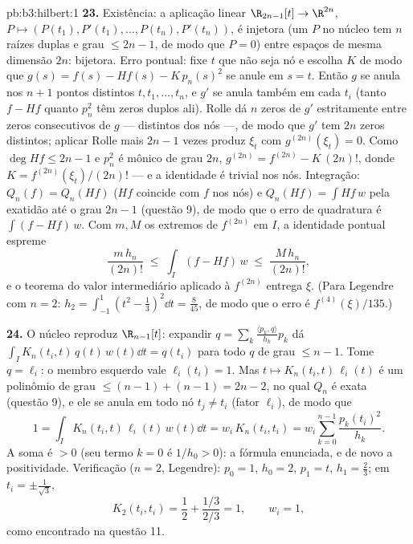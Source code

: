 \begin{solution}{pb:b3:hilbert:1}
\textbf{23.} Existência: a aplicação linear $\R_{2n-1}[t] \to
\R^{2n}$, $P \mapsto (P(t_1), P'(t_1), \dots, P(t_n),
P'(t_n))$, é injetora (um $P$ no núcleo tem $n$ raízes duplas
e grau $\leq 2n - 1$, de modo que $P = 0$) entre espaços de
mesma dimensão $2n$: bijetora. Erro pontual: fixe $t$
que não seja nó e escolha $K$ de modo que $g(s) = f(s) - Hf(s) -
K\,p_n(s)^2$ se anule em $s = t$. Então $g$ se anula nos
$n + 1$ pontos distintos $t, t_1, \dots, t_n$, e $g'$
se anula também em cada $t_i$ (tanto $f - Hf$ quanto $p_n^2$ têm
zeros duplos ali). Rolle dá $n$ zeros de $g'$ estritamente
entre zeros consecutivos de $g$ --- distintos dos nós
---, de modo que $g'$ tem $2n$ zeros distintos; aplicar Rolle mais $2n - 1$
vezes produz $\xi_t$ com $g^{(2n)}(\xi_t) = 0$.
Como $\deg Hf \leq 2n - 1$ e $p_n^2$ é mônico de grau
$2n$, $g^{(2n)} = f^{(2n)} - K\,(2n)!$, donde $K =
f^{(2n)}(\xi_t)/(2n)!$ --- e a identidade é trivial nos
nós. Integração: $Q_n(f) = Q_n(Hf)$ ($Hf$ coincide com $f$
nos nós) e $Q_n(Hf) = \int Hf\,w$ pela exatidão até o
grau $2n - 1$ (questão 9), de modo que o erro de quadratura é
$\int(f - Hf)\,w$. Com $m, M$ os extremos de $f^{(2n)}$ em
$I$, a identidade pontual espreme
\[
\frac{m\,h_n}{(2n)!} \;\leq\; \int_I(f - Hf)\,w
\;\leq\; \frac{M\,h_n}{(2n)!} ,
\]
e o teorema do valor intermediário aplicado à 
$f^{(2n)}$ entrega $\xi$. (Para Legendre com $n = 2$: $h_2
= \int_{-1}^1(t^2 - \frac13)^2\dd t = \frac8{45}$, de modo que o
erro é $f^{(4)}(\xi)/135$.)

\textbf{24.} O núcleo reproduz $\R_{n-1}[t]$: expandir
$q = \sum_k\frac{\langle p_k, q\rangle}{h_k}p_k$ dá
$\int_I K_n(t_i, t)\,q(t)\,w(t)\dd t = q(t_i)$ para todo
$q$ de grau $\leq n - 1$. Tome $q = \ell_i$: o membro esquerdo
vale $\ell_i(t_i) = 1$. Mas $t \mapsto K_n(t_i,
t)\,\ell_i(t)$ é um polinômio de grau $\leq (n - 1) + (n
- 1) = 2n - 2$, no qual $Q_n$ é exata (questão 9), e ele
se anula em todo nó $t_j \neq t_i$ (fator $\ell_i$), de modo que
\[
1 = \int_I K_n(t_i, t)\,\ell_i(t)\,w(t)\dd t
= w_i\,K_n(t_i, t_i)
= w_i\sum_{k=0}^{n-1}\frac{p_k(t_i)^2}{h_k} .
\]
A soma é $> 0$ (seu termo $k = 0$ é $1/h_0 > 0$): a
fórmula enunciada, e de novo a positividade. Verificação ($n = 2$,
Legendre): $p_0 = 1$, $h_0 = 2$, $p_1 = t$, $h_1 = \frac23$;
em $t_i = \pm\frac1{\sqrt3}$,
\[
K_2(t_i, t_i) = \frac12 + \frac{1/3}{2/3} = 1,
\qquad w_i = 1,
\]
como encontrado na questão 11.


\end{solution}
